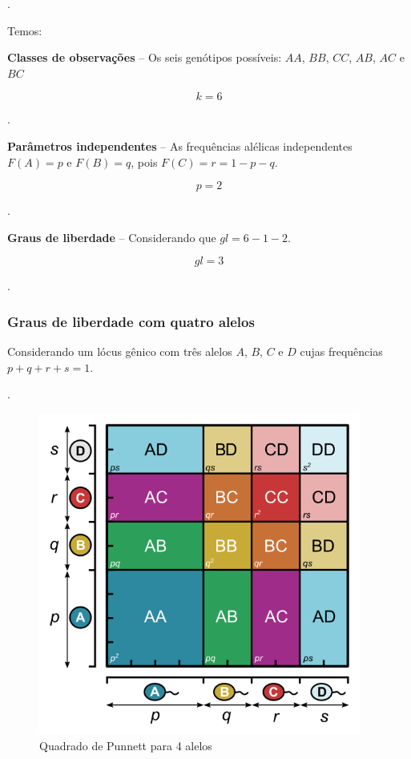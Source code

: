 \documentclass[
]{book}
\begin{document}
.\linebreak

Temos:

\textbf{Classes de observações} -- Os seis genótipos possíveis: \(AA\), \(BB\), \(CC\), \(AB\), \(AC\) e \(BC\)

\[k=6\]

.\linebreak

\textbf{Parâmetros independentes} -- As frequências alélicas independentes \(F(A)=p\) e \(F(B)=q\), pois \(F(C)=r=1-p-q\).

\[p=2\]

.\linebreak

\textbf{Graus de liberdade} -- Considerando que \(gl=6-1-2\).

\[gl=3\]

.\linebreak

\hypertarget{graus-de-liberdade-com-quatro-alelos}{%
\subsubsection{Graus de liberdade com quatro alelos}\label{graus-de-liberdade-com-quatro-alelos}}

Considerando um lócus gênico com três alelos \(A\), \(B\), \(C\) e \(D\) cujas frequências \(p+q+r+s=1\).

.\linebreak

\begin{figure}

{\centering \includegraphics[width=400px]{figs/punnett_4alelles} 

}

\caption{Quadrado de Punnett para 4 alelos}\label{fig:gl4alelos}
\end{figure}
\end{document}
